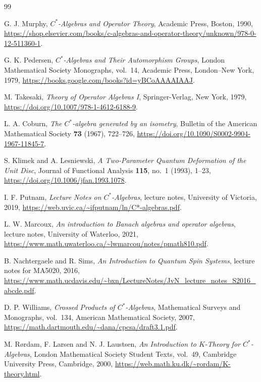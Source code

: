 \documentclass{book}
\begin{document}
\begin{thebibliography}{99}

  G. J. Murphy,
  \textit{\(C^*\)-Algebras and Operator Theory},
  Academic Press,
  Boston,
  1990,
  \url{https://shop.elsevier.com/books/c-algebras-and-operator-theory/unknown/978-0-12-511360-1}.

  G. K. Pedersen,
  \textit{\(C^*\)-Algebras and Their Automorphism Groups},
  London Mathematical Society Monographs, vol.~14,
  Academic Press,
  London--New York,
  1979,
  \url{https://books.google.com/books?id=yBCoAAAAIAAJ}.

  M. Takesaki,
  \textit{Theory of Operator Algebras I},
  Springer-Verlag,
  New York,
  1979,
  \url{https://doi.org/10.1007/978-1-4612-6188-9}.

  L. A. Coburn,
  \textit{The \(C^*\)-algebra generated by an isometry},
  Bulletin of the American Mathematical Society \textbf{73} (1967), 722--726,
  \url{https://doi.org/10.1090/S0002-9904-1967-11845-7}.

  S. Klimek and A. Lesniewski,
  \textit{A Two-Parameter Quantum Deformation of the Unit Disc},
  Journal of Functional Analysis \textbf{115}, no.~1 (1993), 1--23,
  \url{https://doi.org/10.1006/jfan.1993.1078}.

  I. F. Putnam,
  \textit{Lecture Notes on \(C^*\)-Algebras},
  lecture notes, University of Victoria,
  2019,
  \url{https://web.uvic.ca/~ifputnam/ln/C*-algebras.pdf}.

  L. W. Marcoux,
  \textit{An introduction to Banach algebras and operator algebras},
  lecture notes, University of Waterloo,
  2021,
  \url{https://www.math.uwaterloo.ca/~lwmarcou/notes/pmath810.pdf}.

  B. Nachtergaele and R. Sims,
  \textit{An Introduction to Quantum Spin Systems},
  lecture notes for MA5020, 
  2016,
  \url{https://www.math.ucdavis.edu/~bxn/LectureNotes/JvN_lecture_notes_S2016_abcde.pdf}.

  D. P. Williams,
  \textit{Crossed Products of \(C^*\)-Algebras},
  Mathematical Surveys and Monographs, vol.~134,
  American Mathematical Society,
  2007,
  \url{https://math.dartmouth.edu/~dana/cpcsa/draft3.1.pdf}.

  M. R\o rdam, F. Larsen and N. J. Laustsen,
  \textit{An Introduction to \(K\)-Theory for \(C^*\)-Algebras},
  London Mathematical Society Student Texts, vol.~49,
  Cambridge University Press,
  Cambridge,
  2000,
  \url{https://web.math.ku.dk/~rordam/K-theory.html}.


\end{thebibliography}
\end{document}
